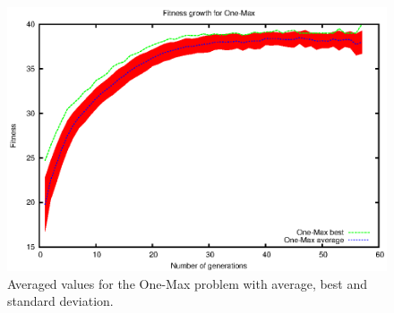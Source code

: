 \begin{figure}[h!]
	\includegraphics{../graphs/fitness_target_one.eps}
	\caption{Averaged values for the One-Max problem 
	with average, best and standard deviation.}
	\label{fig:target one max}
\end{figure}
